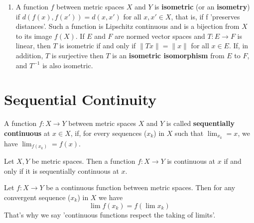 \begin{eg}
\begin{enumerate}[label=(\alph*)]
        \item A function \(f\) between metric spaces \(X\) and \(Y\) is \textbf{isometric}
        (or an \textbf{isometry}) if \(d\left(f\left(x\right), f\left(x{}'\right)\right)
        = d\left(x, x{}'\right)\) for all \(x, x{}' \in X\), that is, if f 'preserves 
        distances'. Such a function is Lipschitz continuous and is a bijection from \(X\)
        to its image \(f\left(X\right)\). If \(E\) and \(F\) are normed vector spaces 
        and \(T \colon E \to F\) is linear, then \(T\) is isometric if and only if 
        \(\lVert Tx \rVert = \lVert x \rVert\) for all \(x \in E\). If, in addition, 
        \(T\) is surjective then \(T\) is an \textbf{isometric isomorphism} from \(E\)
        to \(F\), and \(T^{-1}\) is also isometric. 
    \end{enumerate}
\end{eg}

\section{Sequential Continuity}

\begin{definition}\label{def: sequential_conti}
    A function \(f \colon X \to Y\) between metric spaces \(X\) and \(Y\) is called 
    \textbf{sequentially continuous} at \(x \in X\), if, for every sequences (\(x_k\))
    in \(X\) such that \(\lim_{x_k} = x\), we have \(\lim_{f\left(x_k\right)} = f\left(x\right)\). 
\end{definition}

\begin{theorem}
    Let \(X, Y\) be metric spaces. Then a function \(f \colon X \to Y\) is continuous 
    at \(x\) if and only if it is sequentially continuous at \(x\). 
\end{theorem}

Let \(f \colon X \to Y\) be a continuous function between metric spaces. Then for any 
convergent sequence (\(x_k\)) in \(X\) we have 
\[
    \lim f(x_k) = f(\lim x_k)  
\]
That's why we say 'continuous functions respect the taking of limits'. 

